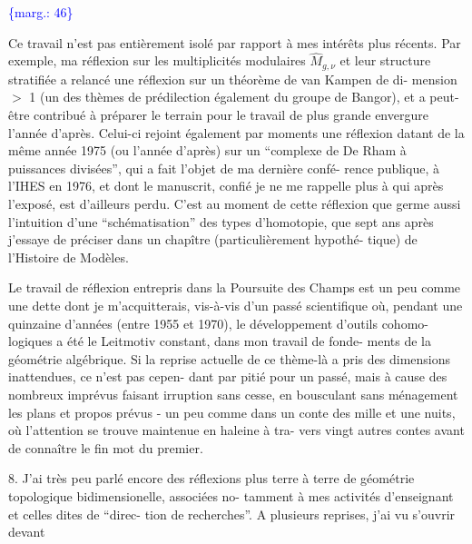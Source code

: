 \documentclass[11pt]{article}
\newcommand{\scanpage}[1]{\par\bigskip\noindent{\small\sffamily[scan #1]}\par}
\newcommand{\mspage}[1]{{\small\sffamily[p.\,#1]}}
\newcommand{\margin}[1]{\textcolor{blue}{\{\textsf{marg.:} #1\}}}
\begin{document}
\margin{46}

\clearpage
\scanpage{119/47}
\mspage{45}

Ce travail n'est pas entièrement isolé par rapport à
mes intérêts plus récents. Par exemple, ma réflexion sur les
multiplicités modulaires $\widehat{M}_{g,\nu}$ et leur structure stratifiée
a relancé une réflexion sur un théorème de van Kampen de di-%
mension $>$ 1 (un des thèmes de prédilection également du groupe
de Bangor), et a peut-être contribué à préparer le terrain pour
le travail de plus grande envergure l'année d'après. Celui-ci
rejoint également par moments une réflexion datant de la même
année 1975 (ou l'année d'après) sur un ``complexe de De Rham à
puissances divisées'', qui a fait l'objet de ma dernière confé-%
rence publique, à l'IHES en 1976, et dont le manuscrit, confié
je ne me rappelle plus à qui après l'exposé, est d'ailleurs perdu.
C'est au moment de cette réflexion que germe aussi l'intuition
d'une ``schématisation'' des types d'homotopie, que sept ans après
j'essaye de préciser dans un chapître (particulièrement hypothé-%
tique) de l'Histoire de Modèles.

Le travail de réflexion entrepris dans la Poursuite
des Champs est un peu comme une dette dont je m'acquitterais,
vis-à-vis d'un passé scientifique où, pendant une quinzaine
d'années (entre 1955 et 1970), le développement d'outils cohomo-%
logiques a été le Leitmotiv constant, dans mon travail de fonde-%
ments de la géométrie algébrique. Si la reprise actuelle de ce
thème-là a pris des dimensions inattendues, ce n'est pas cepen-%
dant par pitié pour un passé, mais à cause des nombreux imprévus
faisant irruption sans cesse, en bousculant sans ménagement les
plans et propos prévus - un peu comme dans un conte des mille et
une nuits, où l'attention se trouve maintenue en haleine à tra-%
vers vingt autres contes avant de connaître le fin mot du premier.


8. J'ai très peu parlé encore des réflexions plus terre
à terre de géométrie topologique bidimensionelle, associées no-%
tamment à mes activités d'enseignant et celles dites de ``direc-%
tion de recherches''. A plusieurs reprises, j'ai vu s'ouvrir devant
\end{document}
